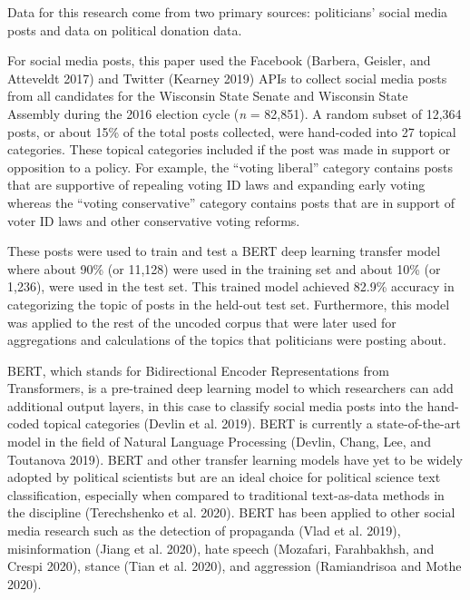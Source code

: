 \documentclass[12pt,]{article}
\begin{document}
Data for this research come from two primary sources: politicians'
social media posts and data on political donation data.

For social media posts, this paper used the Facebook (Barbera, Geisler,
and Atteveldt 2017) and Twitter (Kearney 2019) APIs to collect social
media posts from all candidates for the Wisconsin State Senate and
Wisconsin State Assembly during the 2016 election cycle (\emph{n} =
82,851). A random subset of 12,364 posts, or about 15\% of the total
posts collected, were hand-coded into 27 topical categories. These
topical categories included if the post was made in support or
opposition to a policy. For example, the ``voting liberal'' category
contains posts that are supportive of repealing voting ID laws and
expanding early voting whereas the ``voting conservative'' category
contains posts that are in support of voter ID laws and other
conservative voting reforms.

These posts were used to train and test a BERT deep learning transfer
model where about 90\% (or 11,128) were used in the training set and
about 10\% (or 1,236), were used in the test set. This trained model
achieved 82.9\% accuracy in categorizing the topic of posts in the
held-out test set. Furthermore, this model was applied to the rest of
the uncoded corpus that were later used for aggregations and
calculations of the topics that politicians were posting about.

BERT, which stands for Bidirectional Encoder Representations from
Transformers, is a pre-trained deep learning model to which researchers
can add additional output layers, in this case to classify social media
posts into the hand-coded topical categories (Devlin et al. 2019). BERT
is currently a state-of-the-art model in the field of Natural Language
Processing (Devlin, Chang, Lee, and Toutanova 2019). BERT and other
transfer learning models have yet to be widely adopted by political
scientists but are an ideal choice for political science text
classification, especially when compared to traditional text-as-data
methods in the discipline (Terechshenko et al. 2020). BERT has been
applied to other social media research such as the detection of
propaganda (Vlad et al. 2019), misinformation (Jiang et al. 2020), hate
speech (Mozafari, Farahbakhsh, and Crespi 2020), stance (Tian et al.
2020), and aggression (Ramiandrisoa and Mothe 2020).
\end{document}
